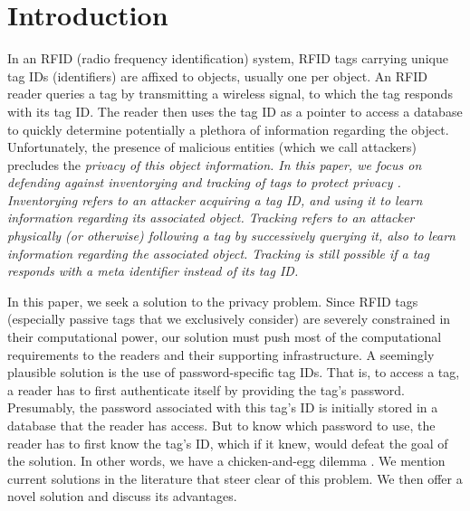\section{Introduction}
\label{sec:Introduction}
In an RFID (radio frequency identification) system, RFID tags carrying unique tag IDs (identifiers) are affixed to objects, usually one per object.  An RFID reader queries a tag by transmitting a wireless signal, to which the tag responds with its tag ID.  The reader then uses the tag ID as a pointer to access a database to quickly determine potentially a plethora of information regarding the object.  Unfortunately, the presence of malicious entities (which we call attackers) precludes the \em privacy \em of this object information.  In this paper, we focus on defending against \em inventorying \em and \em tracking \em of tags to protect privacy \cite{journal:Juels01}.  Inventorying refers to an attacker acquiring a tag ID, and using it to learn information regarding its associated object.  Tracking refers to an attacker physically (or otherwise) following a tag by successively querying it, also to learn information regarding the associated object.  Tracking is still possible if a tag responds with a meta identifier instead of its tag ID.

In this paper, we seek a solution to the privacy problem.  Since RFID tags (especially passive tags that we exclusively consider) are severely constrained in their computational power, our solution must push most of the computational requirements to the readers and their supporting infrastructure.  A seemingly plausible solution is the use of password-specific tag IDs.  That is, to access a tag, a reader has to first authenticate itself by providing the tag's password.  Presumably, the password associated with this tag's ID is initially stored in a database that the reader has access.  But to know which password to use, the reader has to first know the tag's ID, which if it knew, would defeat the goal of the solution.  In other words, we have a chicken-and-egg dilemma \cite{journal:Langheinrich01}.  We mention current solutions in the literature that steer clear of this problem. We then offer a novel solution and discuss its advantages.

